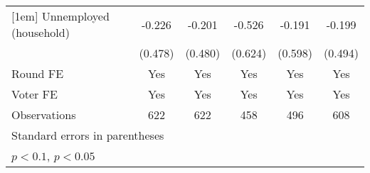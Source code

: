 \begin{table}[htbp]
\begin{tabular}{l*{5}{c}}
[1em]
Unnemployed (household)&      -0.226       &      -0.201       &      -0.526       &      -0.191       &      -0.199       \\
                    &     (0.478)       &     (0.480)       &     (0.624)       &     (0.598)       &     (0.494)       \\
[1em]
\hline  Round FE    &         Yes       &         Yes       &         Yes       &         Yes       &         Yes       \\
[1em]
Voter FE            &         Yes       &         Yes       &         Yes       &         Yes       &         Yes       \\
\hline
Observations        &         622       &         622       &         458       &         496       &         608       \\
\hline\hline
\multicolumn{6}{l}{\footnotesize Standard errors in parentheses}\\
\multicolumn{6}{l}{\footnotesize \sym{+} \(p<0.1\), \sym{*} \(p<0.05\)}\\
\end{tabular}
\end{table}
